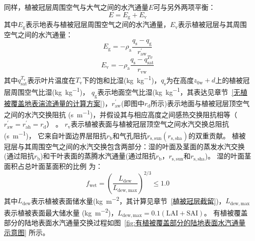 同样，植被冠层周围空气与大气之间的水汽通量$E$可与另外两项平衡：
\begin{equation}\label{EV_balance}
  E=E_{\mathrm{g}}+E_{\mathrm{v}}
\end{equation}
其中$E_{\mathrm{g}}$表示地表与植被冠层周围空气之间的水汽通量，$E_{\mathrm{v}}$表示植被冠层与其周围空气之间的水汽通量：
\begin{equation}\label{eq:Eg}
  E_{\mathrm{g}}=-\rho_{\mathrm{a}} \frac{q_{\mathrm{s}}-q_{\mathrm{g}}}{r_{\mathrm{a w}}^{\prime}}
\end{equation}
\begin{equation}
  E_{\mathrm{v}}=-\rho_{\mathrm{a}} \frac{q_{\mathrm{s}}-q_{\mathrm{s a t}}^{T v}}{r_{\mathrm{vw}}}
\end{equation}
其中$q_{\mathrm{sat}}^{T_{\mathrm v}}$表示叶片温度在$T_{\mathrm v}$下的饱和比湿(\unit{kg.kg^{-1}})，$q_{\mathrm {s}}$为在高度$z_{\mathrm{0w}}+d$上的植被冠层周围空气比湿(\unit{kg.kg^{-1}})，
$q_{\mathrm {g}}$表示地面空气比湿(\unit{kg.kg^{-1}}，其表达见章节~\ref{无植被覆盖地表湍流通量的计算方案})，$r_{\mathrm{aw}}^\prime$(即图中$r_{\mathrm {d}}$所示)表示地面与植被冠层顶空气之间的水汽交换阻抗 (\unit{s.m^{-1}})，并假设其与相应高度之间感热交换阻抗相等（$r_{\mathrm{aw}}^\prime=r_{\mathrm{ah}}^\prime=r_{\mathrm {d}}$）
。
$r_{\mathrm{v}}$表示植被表面与植被冠层顶空气之间水汽交换总阻抗 (\unit{s.m^{-1}})，
它来自叶面边界层阻抗$r_{\mathrm {b}}$和气孔阻抗$r_{\mathrm{s,sun}}\left(r_{\mathrm{s,sha}}\right)$的双重贡献。
植被冠层与其周围空气之间的水汽交换包含两部分：湿的叶面及茎面的蒸发水汽交换(通过阻抗$r_{\mathrm {b}}$)和干叶表面的蒸腾水汽通量(通过阻抗$r_{\mathrm {b}}$，$r_{\mathrm{s,sun}}$和$r_{\mathrm{s,sha}}$)。
湿的叶面茎面积占总叶面茎面积的比例 \citep{dickinson1993biosphere} 为：
\begin{equation}\label{eq:fwet}
  f_{\mathrm{wet}}=\left(\frac{L_{\mathrm{dew}}}{L_{\mathrm{dew,max }}}\right)^{2 / 3} \leqslant 1.0
\end{equation}
其中$L_{\mathrm{dew}}$表示植被表面储水量(\unit{kg.m^{-2}}，其计算见章节~\ref{植被冠层截留})，$L_{\mathrm{dew,max}}$表示植被表面最大储水量
(\unit{kg.m^{-2}})，$L_{\mathrm{dew,max}}=0.1\left(\text {LAI}+ \text {SAI}\right)$。
有植被覆盖部分的陆地表面水汽通量交换过程如图~\ref{fig:有植被覆盖部分的陆地表面水汽通量示意图} 所示。
